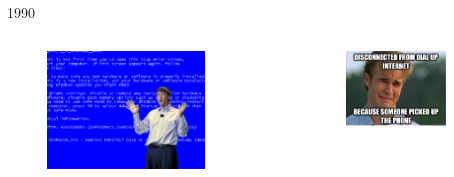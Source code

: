 \documentclass[10pt, compress, aspectratio=169]{beamer}
\begin{document}
\begin{frame}{1990}
  \begin{columns}[T]
    \begin{column}{.5\textwidth}
      \begin{figure}[ht]
        \centering
        \includegraphics[width=0.8\textwidth, keepaspectratio=true]{images/1990_5.png}
      \end{figure}
    \end{column}

    \hfill

    \begin{column}{.5\textwidth}
      \begin{figure}[ht]
        \centering
        \includegraphics[width=0.8\textwidth, keepaspectratio=true]{images/dial-up.jpg}
      \end{figure}
    \end{column}
  \end{columns}
\end{frame}
\end{document}
